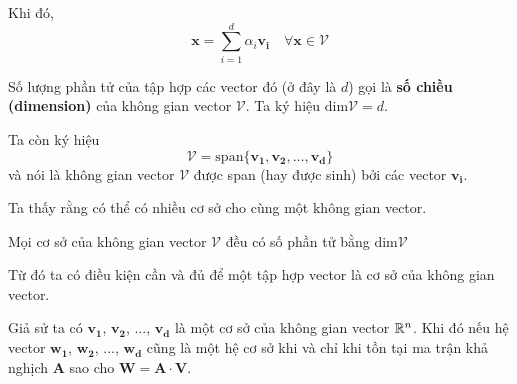 Khi đó,
\[\bm{x} = \sum_{i=1}^{d} \alpha_i \bm{v_i} \quad \forall \bm{x} \in \mathcal{V}\]

Số lượng phần tử của tập hợp các vector đó (ở đây là $d$) gọi là \textbf{số chiều (dimension)} của không gian vector $\mathcal{V}$.
Ta ký hiệu $\text{dim} \mathcal{V} = d$.

Ta còn ký hiệu 
\[\mathcal{V} = \text{span} \{\bm{v_1}, \bm{v_2}, \ldots, \bm{v_d}\}\]
và nói là không gian vector $\mathcal{V}$ được span (hay được sinh) bởi các vector $\bm{v_i}$.

Ta thấy rằng có thể có nhiều cơ sở cho cùng một không gian vector.

\begin{theorem}
    Mọi cơ sở của không gian vector $\mathcal{V}$ đều có số phần tử bằng $\text{dim} \mathcal{V}$
\end{theorem}

Từ đó ta có điều kiện cần và đủ để một tập hợp vector là cơ sở của không gian vector.

Giả sử ta có $\bm{v_1}$, $\bm{v_2}$, ..., $\bm{v_d}$ là một cơ sở của không gian vector $\mathbb{R}^n$.
Khi đó nếu hệ vector $\bm{w_1}$, $\bm{w_2}$, ..., $\bm{w_d}$ cũng là một hệ cơ sở khi và chỉ khi tồn 
tại ma trận khả nghịch $\bm{A}$ sao cho $\bm{W} = \bm{A} \cdot \bm{V}$.

